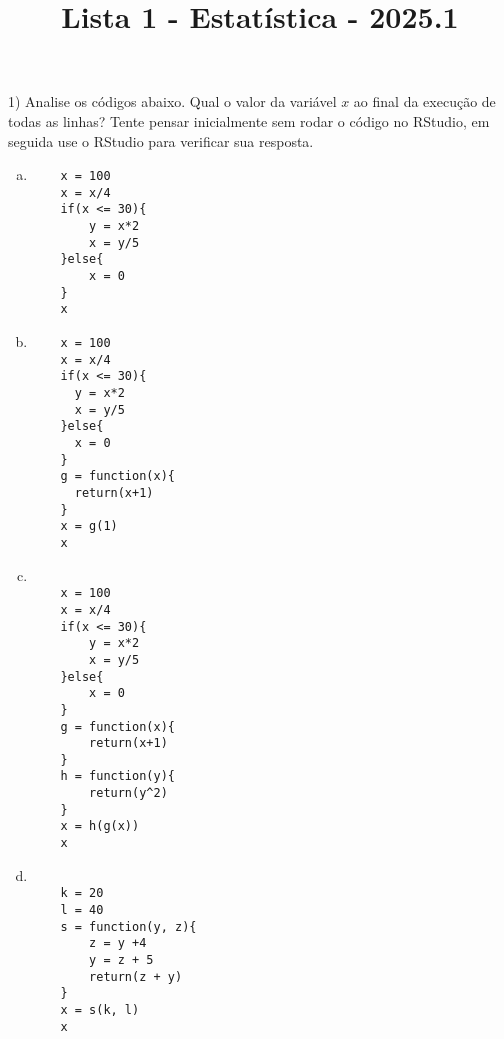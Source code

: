 \documentclass{article}
\title{Lista 1 - Estatística - 2025.1}
\begin{document}
\date{}
\maketitle

1) Analise os códigos abaixo. Qual o valor da variável $x$ ao final da execução de todas as linhas? Tente pensar inicialmente sem rodar o código no RStudio,
em seguida use o RStudio para verificar sua resposta. 
\begin{enumerate}[a)]
    \item 
    
\begin{verbatim}
    x = 100
    x = x/4
    if(x <= 30){
        y = x*2
        x = y/5
    }else{
        x = 0
    }
    x
    \end{verbatim}

    \item 
    
\begin{verbatim}
    x = 100
    x = x/4
    if(x <= 30){
      y = x*2
      x = y/5
    }else{
      x = 0
    }
    g = function(x){
      return(x+1)
    }
    x = g(1)
    x
    \end{verbatim}
    \vspace{14px}
    \item
    \begin{verbatim}

    x = 100
    x = x/4
    if(x <= 30){
        y = x*2
        x = y/5
    }else{
        x = 0
    }
    g = function(x){
        return(x+1)
    }
    h = function(y){
        return(y^2)
    }
    x = h(g(x))
    x
    \end{verbatim}
\item

\begin{verbatim}

    k = 20
    l = 40
    s = function(y, z){
        z = y +4
        y = z + 5
        return(z + y)
    }
    x = s(k, l)
    x
\end{verbatim}

\end{enumerate}
\end{document}
